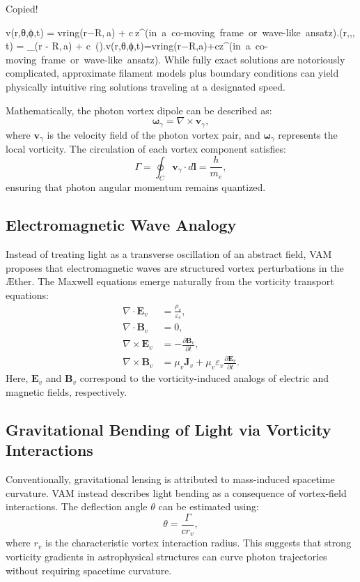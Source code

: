 Copied!

v(r,θ,ϕ,t)  =  vring(r−R, a)  +  c z^(in a co-moving frame or wave-like ansatz).(r,\theta,\phi, t)
\;=\;
_{}\bigl(r - R,\,a\bigr)
\;+\;
c\,
\quad
().v(r,θ,ϕ,t)=vring​(r−R,a)+cz^(in a co-moving frame or wave-like ansatz).
While fully exact solutions are notoriously complicated, approximate filament models plus boundary conditions can yield physically intuitive ring solutions traveling at a designated speed.




Mathematically, the photon vortex dipole can be described as:
\begin{equation}
    \boldsymbol{\omega}_{\gamma} = \nabla \times \mathbf{v}_{\gamma},
\end{equation}
where $\mathbf{v}_{\gamma}$ is the velocity field of the photon vortex pair, and $\boldsymbol{\omega}_{\gamma}$ represents the local vorticity. The circulation of each vortex component satisfies:
\begin{equation}
    \Gamma = \oint_C \mathbf{v}_{\gamma} \cdot d\mathbf{l} = \frac{h}{m_e},
\end{equation}
ensuring that photon angular momentum remains quantized.

\subsection{Electromagnetic Wave Analogy}
Instead of treating light as a transverse oscillation of an abstract field, VAM proposes that electromagnetic waves are structured vortex perturbations in the \AE ther. The Maxwell equations emerge naturally from the vorticity transport equations:
\begin{align}
    \nabla \cdot \mathbf{E}_v &= \frac{\rho_v}{\varepsilon_v}, \\
    \nabla \cdot \mathbf{B}_v &= 0, \\
    \nabla \times \mathbf{E}_v &= - \frac{\partial \mathbf{B}_v}{\partial t}, \\
    \nabla \times \mathbf{B}_v &= \mu_v \mathbf{J}_v + \mu_v \varepsilon_v \frac{\partial \mathbf{E}_v}{\partial t}.
\end{align}
Here, $\mathbf{E}_v$ and $\mathbf{B}_v$ correspond to the vorticity-induced analogs of electric and magnetic fields, respectively.

\subsection{Gravitational Bending of Light via Vorticity Interactions}
Conventionally, gravitational lensing is attributed to mass-induced spacetime curvature. VAM instead describes light bending as a consequence of vortex-field interactions. The deflection angle $\theta$ can be estimated using:
\begin{equation}
    \theta = \frac{\Gamma}{c r_v},
\end{equation}
where $r_v$ is the characteristic vortex interaction radius. This suggests that strong vorticity gradients in astrophysical structures can curve photon trajectories without requiring spacetime curvature.

